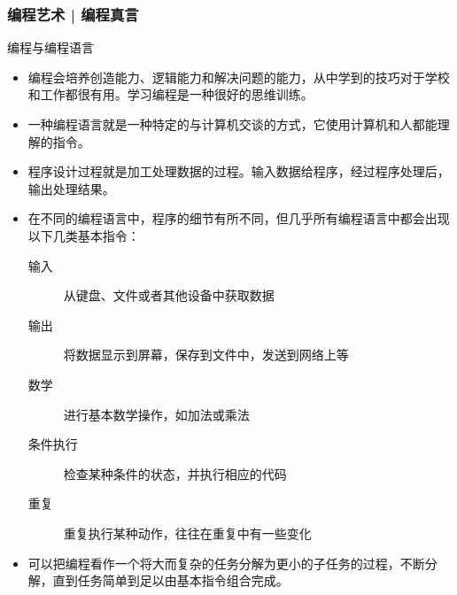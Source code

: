 \begin{frame}
  \frametitle{编程艺术 | 编程真言}
  {\footnotesize
  \begin{block}{编程与编程语言}
    \begin{itemize}
      \item 编程会培养\alert{创造能力、逻辑能力和解决问题的能力}，从中学到的技巧对于学校和工作都很有用。学习编程是一种很好的\alert{思维训练}。
      \item 一种编程语言就是一种特定的与计算机\alert{交谈的方式}，它使用计算机和人都能理解的指令。
      \item 程序设计过程就是\alert{加工处理数据}的过程。输入数据给程序，经过程序处理后，输出处理结果。
      \item 在不同的编程语言中，程序的细节有所不同，但几乎所有编程语言中都会出现以下几类\alert{基本指令}：
        \begin{description}
          \item[输入] 从键盘、文件或者其他设备中获取数据
          \item[输出] 将数据显示到屏幕，保存到文件中，发送到网络上等
          \item[数学] 进行基本数学操作，如加法或乘法
          \item[条件执行] 检查某种条件的状态，并执行相应的代码 
          \item[重复] 重复执行某种动作，往往在重复中有一些变化 
        \end{description}
      \item 可以把编程看作一个\alert{将大而复杂的任务分解为更小的子任务的过程}，不断分解，直到任务简单到足以由基本指令组合完成。
    \end{itemize}
  \end{block}
}
\end{frame}

